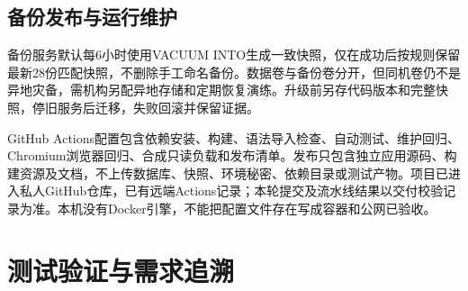 \documentclass[UTF8,12pt,a4paper,fontset=none]{ctexart}
\begin{document}
\subsection{备份发布与运行维护}
备份服务默认每6小时使用VACUUM INTO生成一致快照，仅在成功后按规则保留最新28份匹配快照，不删除手工命名备份。数据卷与备份卷分开，但同机卷仍不是异地灾备，需机构另配异地存储和定期恢复演练。升级前另存代码版本和完整快照，停旧服务后迁移，失败回滚并保留证据。\par
GitHub Actions配置包含依赖安装、构建、语法导入检查、自动测试、维护回归、Chromium浏览器回归、合成只读负载和发布清单。发布只包含独立应用源码、构建资源及文档，不上传数据库、快照、环境秘密、依赖目录或测试产物。项目已进入私人GitHub仓库，已有远端Actions记录；本轮提交及流水线结果以交付校验记录为准。本机没有Docker引擎，不能把配置文件存在写成容器和公网已验收。\par
{}
\section{测试验证与需求追溯}
\end{document}
